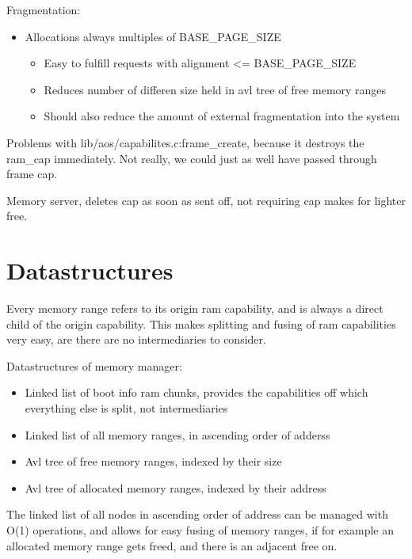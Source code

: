 Fragmentation:
\begin{itemize}
	\item Allocations always multiples of BASE\_PAGE\_SIZE
	\begin{itemize}
		\item Easy to fulfill requests with alignment <= BASE\_PAGE\_SIZE
		\item Reduces number of differen size held in avl tree of free memory ranges
		\item Should also reduce the amount of external fragmentation into the system
	\end{itemize}
\end{itemize}

Problems with lib/aos/capabilites.c:frame\_create, because it destroys the ram\_cap
immediately. Not really, we could just as well have passed through frame cap.

Memory server, deletes cap as soon as sent off, not requiring cap makes for lighter
free.

\section{Datastructures} \label{mem-data}

Every memory range refers to its origin ram capability, and is always a direct
child of the origin capability. This makes splitting and fusing of ram
capabilities very easy, are there are no intermediaries to consider.

Datastructures of memory manager:
\begin{itemize}
	\item Linked list of boot info ram chunks, provides the capabilities off which
				everything else is split, not intermediaries
	\item Linked list of all memory ranges, in ascending order of adderss
	\item Avl tree of free memory ranges, indexed by their size
	\item Avl tree of allocated memory ranges, indexed by their address
\end{itemize}

The linked list of all nodes in ascending order of address can be managed with
O(1) operations, and allows for easy fusing of memory ranges, if for example an
allocated memory range gets freed, and there is an adjacent free on.

